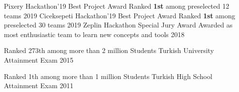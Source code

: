 


\begin{cvopenhonors}
  \cvhonor
    {Pixery Hackathon'19 Best Project Award} %
    {Ranked \textbf{1st} among preselected 12 teams} %
    {} %
    {2019} %
  \cvhonor
    {Ciceksepeti Hackathon'19 Best Project Award} %
    {Ranked \textbf{1st} among preselected 30 teams} %
    {} %
    {2019} %
  \cvhonor
    {Zeplin Hackathon Special Jury Award} %
    {Awarded as most enthusiastic team to learn new concepts and tools} %
    {} %
    {2018} %

  \cvhonor
    {Ranked 273th among more than 2 million Students} %
    {Turkish University Attainment Exam} %
    {} %
    {2015} %
    
  \cvhonor
    {Ranked 1th among more than 1 million Students} %
    {Turkish High School Attainment Exam} %
    {} %
    {2011} %
    \vspace{-5mm}

\end{cvopenhonors}


